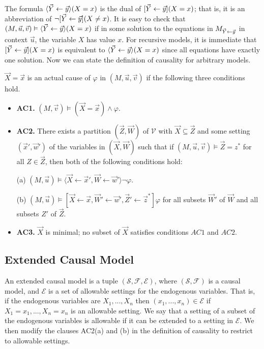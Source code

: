 The formula $\langle \vec Y \leftarrow \vec y \rangle(X=x)$ is the dual
of $[\vec Y \leftarrow \vec y](X=x)$; that is, it is an abbreviation of
$\neg [\vec Y \leftarrow \vec y](X \neq x)$.
It is easy to check that
$(M,\vec u, \vec v) \vDash \langle \vec Y \leftarrow \vec y \rangle(X=x)$
if in some solution to the equations in $M_{\vec Y \leftarrow \vec y}$ in
context $\vec u$, the variable $X$ has value $x$.
For recursive models, it is immediate that
$[\vec Y \leftarrow \vec y](X = x)$ is equivalent to
$\langle \vec Y \leftarrow \vec y \rangle(X=x)$ since all equations
have exactly one solution.
Now we can state the definition of causality for arbitrary models.
\begin{definition}
    $\vec X = \vec x$ is an actual cause of $\varphi$ in
    $(M,\vec u, \vec v) $ if the following three conditions hold.

    \begin{itemize}
        \item  \textbf{AC1.} $(M,\vec v)\models (\vec X = \vec x) \wedge \varphi$.
        \item  \textbf{AC2. }There exists a partition $(\vec Z, \vec W)$ of $\mathcal{V}$ with $\vec X \subseteq \vec Z$ and some setting $(\vec x',\vec w')$ of the variables in $(\vec X,\vec W)$ such that if $(M,\vec u, \vec v)\models \vec Z = z^*$ for all $Z\in \vec Z$, then both of the following conditions hold:

              (a) $(M,\vec u)\models \langle \vec X \leftarrow \vec x', \vec W \leftarrow \vec w' \rangle \neg \varphi$.

              (b) $(M,\vec u)\models[\vec X\leftarrow \vec x, \vec W' \leftarrow \vec w', \vec Z'\leftarrow \vec z^*]\varphi$ for all subsets $\vec W'$ of $\vec W$ and all subsets $Z'$ of $\vec Z$.

        \item  \textbf{AC3.} $\vec X$ is minimal; no subset of $\vec X$ satisfies conditions $AC1$ and $AC2$.
    \end{itemize}
\end{definition}

\subsection{Extended Causal Model}
An extended causal model is a tuple $(\mathcal{S},\mathcal{F},
    \mathcal{E})$, where $(\mathcal{S},\mathcal{F})$ is a causal model, and $\mathcal{E}$ is a set of allowable settings for the endogenous variables.
That is, if the endogenous variables are $X_1,...,X_n$ then
$(x_1,...,x_n) \in \mathcal{E}$ if $X_1 = x_1, ..., X_n=x_n$ is an
allowable setting.
We say that a setting of a subset of the endogenous variables is allowable if it can be extended to a setting in $\mathcal{E}$.
We then modify the clauses AC2(a) and (b) in the definition of causality to restrict to allowable settings.

